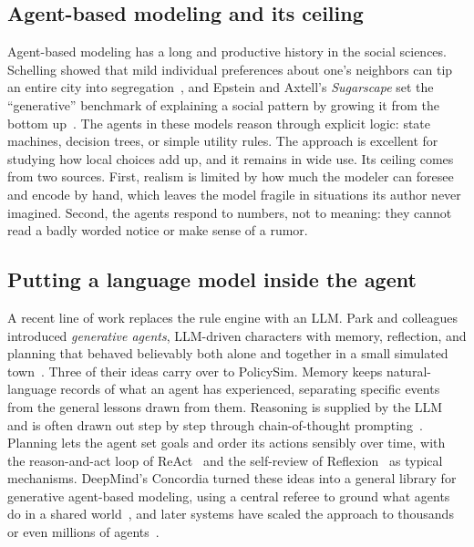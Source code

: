 \documentclass[conference]{IEEEtran}
\begin{document}
\subsection{Agent-based modeling and its ceiling}
Agent-based modeling has a long and productive history in the social sciences. Schelling showed that mild individual preferences about one's neighbors can tip an entire city into segregation~\cite{schelling1971}, and Epstein and Axtell's \emph{Sugarscape} set the ``generative'' benchmark of explaining a social pattern by growing it from the bottom up~\cite{epstein1996}. The agents in these models reason through explicit logic: state machines, decision trees, or simple utility rules. The approach is excellent for studying how local choices add up, and it remains in wide use. Its ceiling comes from two sources. First, realism is limited by how much the modeler can foresee and encode by hand, which leaves the model fragile in situations its author never imagined. Second, the agents respond to numbers, not to meaning: they cannot read a badly worded notice or make sense of a rumor.

\subsection{Putting a language model inside the agent}
A recent line of work replaces the rule engine with an LLM. Park and colleagues introduced \emph{generative agents}, LLM-driven characters with memory, reflection, and planning that behaved believably both alone and together in a small simulated town~\cite{park2023}. Three of their ideas carry over to PolicySim. Memory keeps natural-language records of what an agent has experienced, separating specific events from the general lessons drawn from them. Reasoning is supplied by the LLM and is often drawn out step by step through chain-of-thought prompting~\cite{wei2022}. Planning lets the agent set goals and order its actions sensibly over time, with the reason-and-act loop of ReAct~\cite{yao2023} and the self-review of Reflexion~\cite{shinn2023} as typical mechanisms. DeepMind's Concordia turned these ideas into a general library for generative agent-based modeling, using a central referee to ground what agents do in a shared world~\cite{vezhnevets2023}, and later systems have scaled the approach to thousands or even millions of agents~\cite{piao2025,gao2024}.
\end{document}
